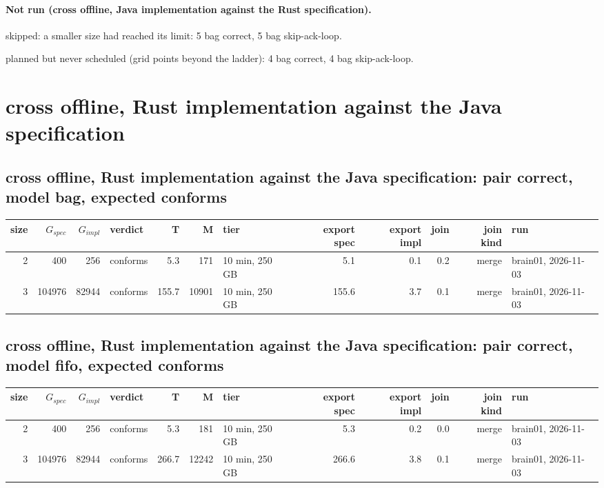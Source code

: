 \documentclass[10pt]{article}
\begin{document}
\paragraph{Not run (cross offline, Java implementation against the Rust specification).}
skipped: a smaller size had reached its limit: 5 bag correct, 5 bag skip-ack-loop.\par
planned but never scheduled (grid points beyond the ladder): 4 bag correct, 4 bag skip-ack-loop.\par
\section*{cross offline, Rust implementation against the Java specification}
\subsection*{cross offline, Rust implementation against the Java specification: pair \textsf{correct}, model bag, expected conforms}
\begin{longtable}{@{}rrrlrrlrrrrl@{}}
\toprule
size & $G_{\mathit{spec}}$ & $G_{\mathit{impl}}$ & verdict & T & M & tier & export spec & export impl & join & join kind & run \\
\midrule
\endhead
\color{blue} 2 & 400 & 256 & conforms & 5.3 & 171 & 10 min, 250 GB & 5.1 & 0.1 & 0.2 & merge & brain01, 2026-11-03 \\
\color{blue} 3 & 104976 & 82944 & conforms & 155.7 & 10901 & 10 min, 250 GB & 155.6 & 3.7 & 0.1 & merge & brain01, 2026-11-03 \\
\bottomrule
\end{longtable}
\subsection*{cross offline, Rust implementation against the Java specification: pair \textsf{correct}, model fifo, expected conforms}
\begin{longtable}{@{}rrrlrrlrrrrl@{}}
\toprule
size & $G_{\mathit{spec}}$ & $G_{\mathit{impl}}$ & verdict & T & M & tier & export spec & export impl & join & join kind & run \\
\midrule
\endhead
\color{blue} 2 & 400 & 256 & conforms & 5.3 & 181 & 10 min, 250 GB & 5.3 & 0.2 & 0.0 & merge & brain01, 2026-11-03 \\
\color{blue} 3 & 104976 & 82944 & conforms & 266.7 & 12242 & 10 min, 250 GB & 266.6 & 3.8 & 0.1 & merge & brain01, 2026-11-03 \\
\bottomrule
\end{longtable}
\end{document}
